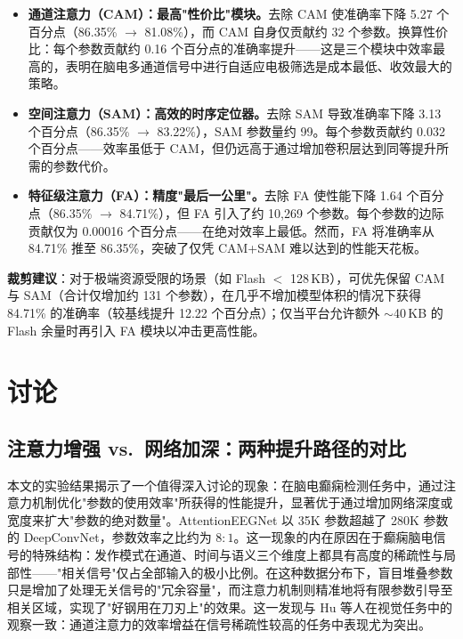\documentclass[12pt, a4paper]{article}
\begin{document}
\begin{itemize}[leftmargin=2.2em]
\item \textbf{通道注意力（CAM）：最高"性价比"模块。}\;去除 CAM 使准确率下降 5.27 个百分点（86.35\% $\rightarrow$ 81.08\%），而 CAM 自身仅贡献约 32 个参数。换算性价比：每个参数贡献约 0.16 个百分点的准确率提升——这是三个模块中效率最高的，表明在脑电多通道信号中进行自适应电极筛选是成本最低、收效最大的策略。
\item \textbf{空间注意力（SAM）：高效的时序定位器。}\;去除 SAM 导致准确率下降 3.13 个百分点（86.35\% $\rightarrow$ 83.22\%），SAM 参数量约 99。每个参数贡献约 0.032 个百分点——效率虽低于 CAM，但仍远高于通过增加卷积层达到同等提升所需的参数代价。
\item \textbf{特征级注意力（FA）：精度"最后一公里"。}\;去除 FA 使性能下降 1.64 个百分点（86.35\% $\rightarrow$ 84.71\%），但 FA 引入了约 10,269 个参数。每个参数的边际贡献仅为 0.00016 个百分点——在绝对效率上最低。然而，FA 将准确率从 84.71\% 推至 86.35\%，突破了仅凭 CAM+SAM 难以达到的性能天花板。
\end{itemize}

\textbf{裁剪建议}：对于极端资源受限的场景（如 Flash $<$ 128\,KB），可优先保留 CAM 与 SAM（合计仅增加约 131 个参数），在几乎不增加模型体积的情况下获得 84.71\% 的准确率（较基线提升 12.22 个百分点）；仅当平台允许额外 $\sim$40\,KB 的 Flash 余量时再引入 FA 模块以冲击更高性能。

\section{讨论}

\subsection{注意力增强 vs.~网络加深：两种提升路径的对比}

本文的实验结果揭示了一个值得深入讨论的现象：在脑电癫痫检测任务中，通过注意力机制优化"参数的使用效率"所获得的性能提升，显著优于通过增加网络深度或宽度来扩大"参数的绝对数量"。AttentionEEGNet 以 35K 参数超越了 280K 参数的 DeepConvNet，参数效率之比约为 $8:1$。这一现象的内在原因在于癫痫脑电信号的特殊结构：发作模式在通道、时间与语义三个维度上都具有高度的稀疏性与局部性——"相关信号"仅占全部输入的极小比例\cite{ref_shoeibi2021}。在这种数据分布下，盲目堆叠参数只是增加了处理无关信号的"冗余容量"，而注意力机制则精准地将有限参数引导至相关区域，实现了"好钢用在刀刃上"的效果。这一发现与 Hu 等人\cite{ref_hu2018}在视觉任务中的观察一致：通道注意力的效率增益在信号稀疏性较高的任务中表现尤为突出。
\end{document}
